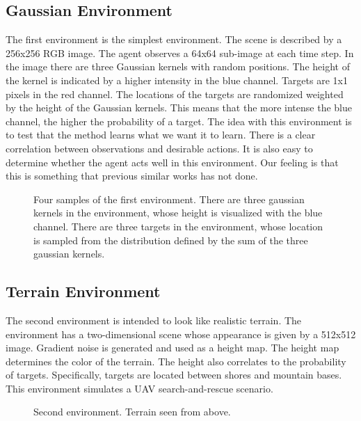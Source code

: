 \subsection{Gaussian Environment}

The first environment is the simplest environment. 
The scene is described by a 256x256 RGB image.
The agent observes a 64x64 sub-image at each time step.
In the image there are three Gaussian kernels with random positions.
The height of the kernel is indicated by a higher intensity in the blue channel.
Targets are 1x1 pixels in the red channel.
The locations of the targets are randomized weighted by the height of the Gaussian kernels.
This means that the more intense the blue channel, the higher the probability of a target.
The idea with this environment is to test that the method learns what we want it to learn.
There is a clear correlation between observations and desirable actions.
It is also easy to determine whether the agent acts well in this environment.
Our feeling is that this is something that previous similar works has not done. %

\begin{figure}
    \centering
    
    \label{fig:gaussian}
    \caption[Gaussian environment]{Four samples of the first environment. There are three gaussian kernels in the environment, whose height is visualized with the blue channel. There are three targets in the environment, whose location is sampled from the distribution defined by the sum of the three gaussian kernels.}
\end{figure}

\subsection{Terrain Environment}

The second environment is intended to look like realistic terrain.
The environment has a two-dimensional scene whose appearance is given by a 512x512 image.
Gradient noise is generated and used as a height map.
The height map determines the color of the terrain.
The height also correlates to the probability of targets.
Specifically, targets are located between shores and mountain bases.
This environment simulates a UAV search-and-rescue scenario.

\begin{figure}
    \centering
    
    \label{fig:terrain}
    \caption[Terrain environment]{Second environment. Terrain seen from above.}
\end{figure}


